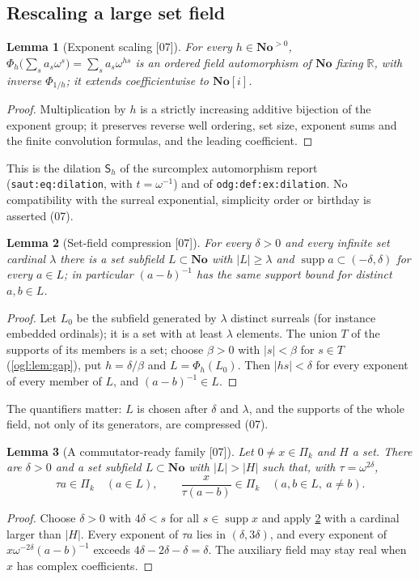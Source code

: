 \documentclass[11pt,oneside]{article}
\numberwithin{equation}{section}
\newtheorem{lemma}[lemma]{Lemma}
\theoremstyle{definition}
\theoremstyle{remark}
\newcommand{\No}{\mathbf{No}}
\newcommand{\SC}{\No[i]}
\newcommand{\R}{\mathbb R}
\newcommand{\supp}{\operatorname{supp}}
\newcommand{\src}[1]{\textup{\textsf{\small[#1]}}}
\newcommand{\replabel}[1]{\nolinkurl{#1}}
\begin{document}
\subsection{Rescaling a large set field}

\begin{lemma}[Exponent scaling \src{07}]\label{ogl:el:lem:scale}
For every $h\in\No^{>0}$,
$\Phi_h\bigl(\sum_sa_s\omega^s\bigr)=\sum_sa_s\omega^{hs}$ is an ordered field
automorphism of $\No$ fixing $\R$, with inverse $\Phi_{1/h}$; it extends
coefficientwise to $\SC$.
\end{lemma}
\begin{proof}
Multiplication by $h$ is a strictly increasing additive bijection of the
exponent group; it preserves reverse well ordering, set size, exponent sums and
the finite convolution formulas, and the leading coefficient.
\end{proof}

This is the dilation $\mathsf S_h$ of the surcomplex automorphism report
(\replabel{saut:eq:dilation}, with $t=\omega^{-1}$) and of
\replabel{odg:def:ex:dilation}. No compatibility with the surreal exponential,
simplicity order or birthday is asserted (07).

\begin{lemma}[Set-field compression \src{07}]\label{ogl:el:lem:compress}
For every $\delta>0$ and every infinite set cardinal $\lambda$ there is a set
subfield $L\subset\No$ with $|L|\ge\lambda$ and $\supp a\subset(-\delta,\delta)$
for every $a\in L$; in particular $(a-b)^{-1}$ has the same support bound for
distinct $a,b\in L$.
\end{lemma}
\begin{proof}
Let $L_0$ be the subfield generated by $\lambda$ distinct surreals (for
instance embedded ordinals); it is a set with at least $\lambda$ elements. The
union $T$ of the supports of its members is a set; choose $\beta>0$ with
$|s|<\beta$ for $s\in T$ (\cref{ogl:lem:gap}), put $h=\delta/\beta$ and
$L=\Phi_h(L_0)$. Then $|hs|<\delta$ for every exponent of every member of $L$,
and $(a-b)^{-1}\in L$.
\end{proof}

The quantifiers matter: $L$ is chosen after $\delta$ and $\lambda$, and the
supports of the whole field, not only of its generators, are compressed (07).

\begin{lemma}[A commutator-ready family \src{07}]\label{ogl:el:lem:ready}
Let $0\ne x\in\Pi_k$ and $H$ a set. There are $\delta>0$ and a set subfield
$L\subset\No$ with $|L|>|H|$ such that, with $\tau=\omega^{2\delta}$,
\[
 \tau a\in\Pi_k\quad(a\in L),\qquad
 \frac{x}{\tau(a-b)}\in\Pi_k\quad(a,b\in L,\ a\ne b).
\]
\end{lemma}
\begin{proof}
Choose $\delta>0$ with $4\delta<s$ for all $s\in\supp x$ and apply
\cref{ogl:el:lem:compress} with a cardinal larger than $|H|$. Every exponent
of $\tau a$ lies in $(\delta,3\delta)$, and every exponent of
$x\omega^{-2\delta}(a-b)^{-1}$ exceeds $4\delta-2\delta-\delta=\delta$. The
auxiliary field may stay real when $x$ has complex coefficients.
\end{proof}
\end{document}
